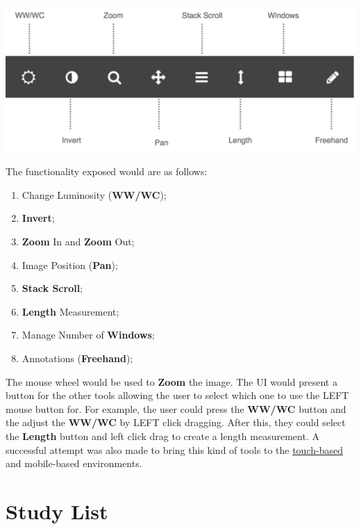 \documentclass{tufte-book} %
\begin{document}
\hfill

\begin{center}
\includegraphics[width=\textwidth]{graphics/tools.png}
\end{center}

\hfill

The functionality exposed would are as follows:

\hfill

\begin{enumerate}
\item Change Luminosity (\textbf{WW/WC});
\item \textbf{Invert};
\item \textbf{Zoom} In and \textbf{Zoom} Out;
\item Image Position (\textbf{Pan});
\item \textbf{Stack Scroll};
\item \textbf{Length} Measurement;
\item Manage Number of \textbf{Windows};
\item Annotations (\textbf{Freehand});
\end{enumerate}

\hfill

The mouse wheel would be used to \textbf{Zoom} the image. The UI would present a button for the other tools allowing the user to select which one to use the LEFT mouse button for. For example, the user could press the \textbf{WW/WC} button and the adjust the \textbf{WW/WC} by LEFT click dragging. After this, they could select the \textbf{Length} button and left click drag to create a length measurement. A successful attempt was also made to bring this kind of tools to the \href{https://dl.acm.org/citation.cfm?id=3134111&CFID=840856188&CFTOKEN=51535574}{touch-based\cite{Calisto:2017:TTM:3132272.3134111}} and mobile-based environments.

\chapter{Study List}
\end{document}
